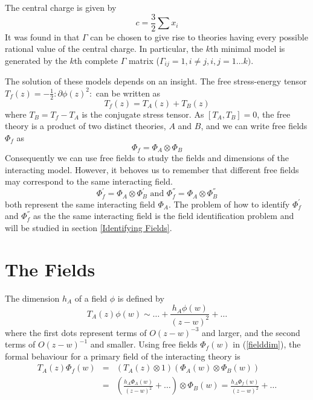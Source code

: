\documentclass[a4paper,a4paper]{article}
\begin{document}
The central charge is given by
\begin{equation}
c = \frac{3}{2}\sum x_i
\end{equation}
It  was found in \cite{Gepner} that $\Gamma$ can be chosen to give rise to 
theories having every possible rational value of the central charge. In
particular, the $k$th minimal model is generated  by the $k$th complete $\Gamma$ matrix 
($\Gamma_{ij} = 1, i \ne j, i,j = 1 \ldots k)$.

The solution of these models depends on an insight. The free stress-energy tensor 
$T_f(z) = -\frac{1}{2} : \partial \phi(z) ^2: $ can be written as
\begin{equation}
T_f(z) = T_A(z) + T_B(z)
\end{equation}
where $T_B = T_f - T_A$ is the conjugate stress tensor. 
As $[T_A, T_B] = 0$, the free theory is a product of two 
distinct theories, $A$ and $B$, and we can write free fields $\Phi_f$ as
\begin{displaymath}
\Phi_f = \Phi_A \otimes \Phi_B
\end{displaymath}
Consequently we can use free fields to study the fields and dimensions of the interacting model.
However, it behoves us to remember that different free fields may correspond to the same
interacting field.
\begin{displaymath}
\Phi_f^{'} = \Phi_A \otimes \Phi_B^{'} \textrm{ and } \Phi_f^{''} = \Phi_A \otimes \Phi_B^{''}
\end{displaymath}
both represent the same interacting field $\Phi_A$. The problem of how to identify $\Phi_f^{'}$ and 
$\Phi_f^{''}$ as the the same interacting field is the field identification problem and will be
studied in section \ref{Identifying Fields}.

\section{The Fields}
\label{Fields}

The dimension $h_A$ of a field $\phi$ is defined by
\begin{equation}
\label{fielddim}
T_A(z)\phi(w) \sim \ldots + \frac{h_A\phi(w)}{(z-w)^2} + \ldots
\end{equation}
where the first dots represent terms of $O(z-w)^{-3}$ and larger, and the second terms of $O(z-w)^{-1}$ and smaller.
Using free fields $\Phi_f(w)$ in (\ref{fielddim}), the formal behaviour for a primary field of the interacting theory is
\begin{eqnarray}
T_A(z)\Phi_f(w) & = & \left(T_A(z)\otimes 1\right)\left(\Phi_A(w) \otimes \Phi_B(w)\right) \nonumber\\
& = & \left(\frac{h_A\Phi_A(w)}{(z-w)^2} + \ldots \right) \otimes \Phi_B(w) = \frac{h_A\Phi_f(w)}{(z-w)^2} + \ldots
\end{eqnarray}
\end{document}
